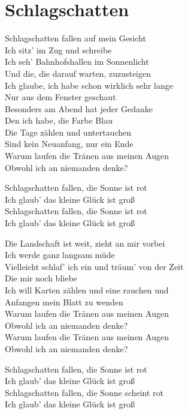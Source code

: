 \documentclass[]{book}
\begin{document}
\hypertarget{schlagschatten-1}{%
\section{Schlagschatten}\label{schlagschatten-1}}

Schlagschatten fallen auf mein Gesicht\\
Ich sitz' im Zug und schreibe\\
Ich seh' Bahnhofshallen im Sonnenlicht\\
Und die, die darauf warten, zuzusteigen\\
Ich glaube, ich habe schon wirklich sehr lange\\
Nur aus dem Fenster geschaut\\
Besonders am Abend hat jeder Gedanke\\
Den ich habe, die Farbe Blau\\
Die Tage zählen und untertauchen\\
Sind kein Neuanfang, nur ein Ende\\
Warum laufen die Tränen aus meinen Augen\\
Obwohl ich an niemanden denke?

Schlagschatten fallen, die Sonne ist rot\\
Ich glaub' das kleine Glück ist groß\\
Schlagschatten fallen, die Sonne ist rot\\
Ich glaub' das kleine Glück ist groß

Die Landschaft ist weit, zieht an mir vorbei\\
Ich werde ganz langsam müde\\
Vielleicht schlaf' ich ein und träum' von der Zeit\\
Die mir noch bliebe\\
Ich will Karten zählen und eine rauchen und\\
Anfangen mein Blatt zu wenden\\
Warum laufen die Tränen aus meinen Augen\\
Obwohl ich an niemanden denke?\\
Warum laufen die Tränen aus meinen Augen\\
Obwohl ich an niemanden denke?

Schlagschatten fallen, die Sonne ist rot\\
Ich glaub' das kleine Glück ist groß\\
Schlagschatten fallen, die Sonne scheint rot\\
Ich glaub' das kleine Glück ist groß
\end{document}
